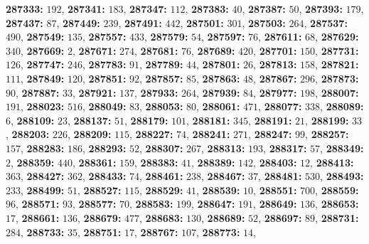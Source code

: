 \textsf{\bfseries 287333:} $192$, \textsf{\bfseries 287341:} $183$, \textsf{\bfseries 287347:} $112$, \textsf{\bfseries 287383:} $40$, \textsf{\bfseries 287387:} $50$, \textsf{\bfseries 287393:} $179$, \textsf{\bfseries 287437:} $87$, \textsf{\bfseries 287449:} $239$, \textsf{\bfseries 287491:} $442$, \textsf{\bfseries 287501:} $301$, \textsf{\bfseries 287503:} $264$, \textsf{\bfseries 287537:} $490$, \textsf{\bfseries 287549:} $135$, \textsf{\bfseries 287557:} $433$, \textsf{\bfseries 287579:} $54$, \textsf{\bfseries 287597:} $76$, \textsf{\bfseries 287611:} $68$, \textsf{\bfseries 287629:} $340$, \textsf{\bfseries 287669:} $2$, \textsf{\bfseries 287671:} $274$, \textsf{\bfseries 287681:} $76$, \textsf{\bfseries 287689:} $420$, \textsf{\bfseries 287701:} $150$, \textsf{\bfseries 287731:} $126$, \textsf{\bfseries 287747:} $246$, \textsf{\bfseries 287783:} $91$, \textsf{\bfseries 287789:} $44$, \textsf{\bfseries 287801:} $26$, \textsf{\bfseries 287813:} $158$, \textsf{\bfseries 287821:} $111$, \textsf{\bfseries 287849:} $120$, \textsf{\bfseries 287851:} $92$, \textsf{\bfseries 287857:} $85$, \textsf{\bfseries 287863:} $48$, \textsf{\bfseries 287867:} $296$, \textsf{\bfseries 287873:} $90$, \textsf{\bfseries 287887:} $33$, \textsf{\bfseries 287921:} $137$, \textsf{\bfseries 287933:} $264$, \textsf{\bfseries 287939:} $84$, \textsf{\bfseries 287977:} $198$, \textsf{\bfseries 288007:} $191$, \textsf{\bfseries 288023:} $516$, \textsf{\bfseries 288049:} $83$, \textsf{\bfseries 288053:} $80$, \textsf{\bfseries 288061:} $471$, \textsf{\bfseries 288077:} $338$, \textsf{\bfseries 288089:} $6$, \textsf{\bfseries 288109:} $23$, \textsf{\bfseries 288137:} $51$, \textsf{\bfseries 288179:} $101$, \textsf{\bfseries 288181:} $345$, \textsf{\bfseries 288191:} $21$, \textsf{\bfseries 288199:} $33$, \textsf{\bfseries 288203:} $226$, \textsf{\bfseries 288209:} $115$, \textsf{\bfseries 288227:} $74$, \textsf{\bfseries 288241:} $271$, \textsf{\bfseries 288247:} $99$, \textsf{\bfseries 288257:} $157$, \textsf{\bfseries 288283:} $186$, \textsf{\bfseries 288293:} $52$, \textsf{\bfseries 288307:} $267$, \textsf{\bfseries 288313:} $193$, \textsf{\bfseries 288317:} $57$, \textsf{\bfseries 288349:} $2$, \textsf{\bfseries 288359:} $440$, \textsf{\bfseries 288361:} $159$, \textsf{\bfseries 288383:} $41$, \textsf{\bfseries 288389:} $142$, \textsf{\bfseries 288403:} $12$, \textsf{\bfseries 288413:} $363$, \textsf{\bfseries 288427:} $362$, \textsf{\bfseries 288433:} $74$, \textsf{\bfseries 288461:} $238$, \textsf{\bfseries 288467:} $37$, \textsf{\bfseries 288481:} $530$, \textsf{\bfseries 288493:} $233$, \textsf{\bfseries 288499:} $51$, \textsf{\bfseries 288527:} $115$, \textsf{\bfseries 288529:} $41$, \textsf{\bfseries 288539:} $10$, \textsf{\bfseries 288551:} $700$, \textsf{\bfseries 288559:} $96$, \textsf{\bfseries 288571:} $93$, \textsf{\bfseries 288577:} $70$, \textsf{\bfseries 288583:} $199$, \textsf{\bfseries 288647:} $191$, \textsf{\bfseries 288649:} $136$, \textsf{\bfseries 288653:} $17$, \textsf{\bfseries 288661:} $136$, \textsf{\bfseries 288679:} $477$, \textsf{\bfseries 288683:} $130$, \textsf{\bfseries 288689:} $52$, \textsf{\bfseries 288697:} $89$, \textsf{\bfseries 288731:} $284$, \textsf{\bfseries 288733:} $35$, \textsf{\bfseries 288751:} $17$, \textsf{\bfseries 288767:} $107$, \textsf{\bfseries 288773:} $14$, 

